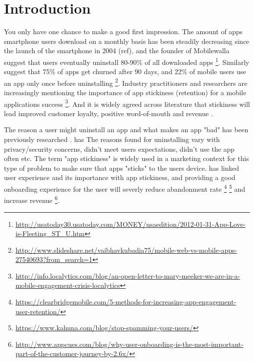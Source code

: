 \chapter{Introduction}
\label{chap:introduction}

You only have one chance to make a good first impression. The amount of apps smartphone users download on a monthly basis has been steadily decreasing since the launch of the smartphone in 2004 (ref), and the founder of Mobilewalla suggest that users eventually uninstall 80-90\% of all downloaded apps \footnote{\url{http://usatoday30.usatoday.com/MONEY/usaedition/2012-01-31-App-Love-is-Fleeting\_ST\_U.htm}}. Similarly \cite{Perro2016} suggest that 75\% of apps get churned after 90 days, and 22\% of mobile users use an app only once before uninstalling \footnote{\url{http://www.slideshare.net/vaibhavkubadia75/mobile-web-vs-mobile-apps-27540693?from_search=1}}. Industry practitioners and researchers are increasingly mentioning the importance of app stickiness (retention) for a mobile applications success \cite{Perro2016} \cite{IGIGlobal2016} \cite{Kim2016} \footnote{\url{http://info.localytics.com/blog/an-open-letter-to-mary-meeker-we-are-in-a-mobile-engagement-crisis-localytics}}. And it is widely agreed across literature that stickiness will lead improved customer loyalty, positive word-of-mouth and revenue \cite{Reichheld2000} \cite{Srinivasan2002} \cite{Hsu2016a}.

The reason a user might uninstall an app and what makes an app "bad" has been previously researched \cite{Lin2012} \cite{Shklovski} \cite{Song2014}. \cite{IGIGlobal2016} has  The reasons found for uninstalling vary with privacy/security concerns, didn't meet users expectations, didn't use the app often etc. The term "app stickiness" is widely used in a marketing context for this type of problem to make sure that apps "sticks" to the users device. \cite{IGIGlobal2016} has linked user experience and its importance with app stickiness, and providing a good onboarding experience for the user will severly reduce abandonment rate \footnote{\url{https://clearbridgemobile.com/5-methods-for-increasing-app-engagement-user-retention/}} \footnote{\url{https://www.kahuna.com/blog/stop-spamming-your-users/}} and increase revenue \footnote{\url{http://www.appcues.com/blog/why-user-onboarding-is-the-most-important-part-of-the-customer-journey-by-2.6x/}}.


